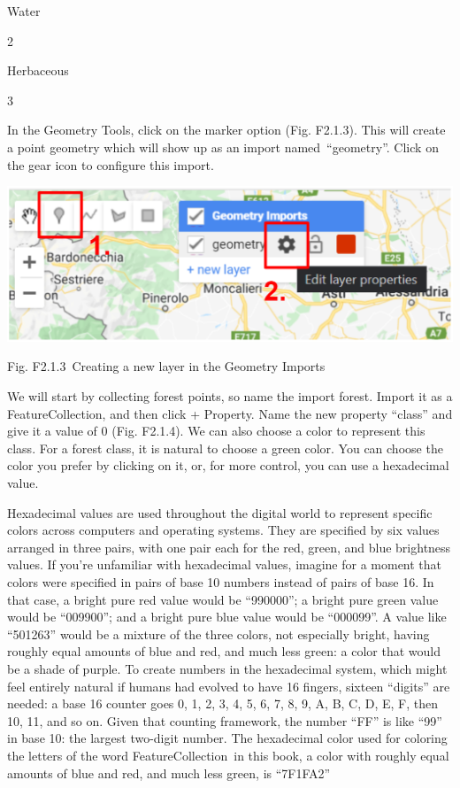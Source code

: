 \documentclass[
  letterpaper,
  DIV=11,
  numbers=noendperiod]{scrreprt}
\begin{document}
Water

2

Herbaceous

3

In the Geometry Tools, click on the marker option (Fig. F2.1.3). This
will create a point geometry which will show up as an import
named~``geometry''. Click on the gear icon to configure this import.

\includegraphics{./F2/image22.png}

Fig. F2.1.3~Creating a new layer in the Geometry Imports

We will start by collecting forest points, so name the import forest.
Import it as a FeatureCollection, and then click + Property. Name the
new property ``class'' and give it a value of 0 (Fig. F2.1.4). We can
also choose a color to represent this class. For a forest class, it is
natural to choose a green color. You can choose the color you prefer by
clicking on it, or, for more control, you can use a hexadecimal value.

Hexadecimal values are used throughout the digital world to represent
specific colors across computers and operating systems. They are
specified by six values arranged in three pairs, with one pair each for
the red, green, and blue brightness values. If you're unfamiliar with
hexadecimal values, imagine for a moment that colors were specified in
pairs of base 10 numbers instead of pairs of base 16. In that case, a
bright pure red value would be ``990000''; a bright pure green value
would be ``009900''; and a bright pure blue value would be ``000099''. A
value like ``501263'' would be a mixture of the three colors, not
especially bright, having roughly equal amounts of blue and red, and
much less green: a color that would be a shade of purple. To create
numbers in the hexadecimal system, which might feel entirely natural if
humans had evolved to have 16 fingers, sixteen ``digits'' are needed: a
base 16 counter goes 0, 1, 2, 3, 4, 5, 6, 7, 8, 9, A, B, C, D, E, F,
then 10, 11, and so on. Given that counting framework, the number ``FF''
is like ``99'' in base 10: the largest two-digit number. The hexadecimal
color used for coloring the letters of the word FeatureCollection~in
this book, a color with roughly equal amounts of blue and red, and much
less green, is ``7F1FA2'' ~
\end{document}
